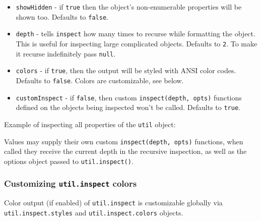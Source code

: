 \begin{itemize}
\item
  \texttt{showHidden} - if \texttt{true} then the object's
  non-enumerable properties will be shown too. Defaults to
  \texttt{false}.
\item
  \texttt{depth} - tells \texttt{inspect} how many times to recurse
  while formatting the object. This is useful for inspecting large
  complicated objects. Defaults to \texttt{2}. To make it recurse
  indefinitely pass \texttt{null}.
\item
  \texttt{colors} - if \texttt{true}, then the output will be styled
  with ANSI color codes. Defaults to \texttt{false}. Colors are
  customizable, see below.
\item
  \texttt{customInspect} - if \texttt{false}, then custom
  \texttt{inspect(depth,\ opts)} functions defined on the objects being
  inspected won't be called. Defaults to \texttt{true}.
\end{itemize}

Example of inspecting all properties of the \texttt{util} object:

\begin{Shaded}
\begin{Highlighting}[]
 \NormalTok{(}\NormalTok{);}

\NormalTok{(}\NormalTok{: }\NormalTok{, }\NormalTok{: } \NormalTok{\}));}
\end{Highlighting}
\end{Shaded}

Values may supply their own custom \texttt{inspect(depth,\ opts)}
functions, when called they receive the current depth in the recursive
inspection, as well as the options object passed to
\texttt{util.inspect()}.

\subsubsection{\texorpdfstring{Customizing \texttt{util.inspect}
colors}{Customizing util.inspect colors}}\label{customizing-util.inspect-colors}

Color output (if enabled) of \texttt{util.inspect} is customizable
globally via \texttt{util.inspect.styles} and
\texttt{util.inspect.colors} objects.


